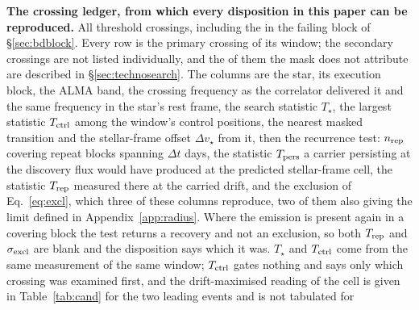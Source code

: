 \begin{table}
\centering
\caption{\textbf{The crossing ledger, from which every disposition in this
paper can be reproduced.} All \EvNCrossRaw{} threshold crossings,
including the \EvNCrossFlag{} in the failing block of \S\ref{sec:bdblock}.
Every row is the primary crossing of its window; the \CkNSecondary{} secondary
crossings are not listed individually, and the \CkNSecUnattrWord{} of them
the mask does not attribute are described in \S\ref{sec:technosearch}. The columns are
the star, its execution block, the ALMA band, the crossing
frequency as the correlator delivered it and the same frequency in the star's
rest frame, the search statistic $T_\star$, the largest statistic
$T_{\rm ctrl}$ among the window's \NCtrl{} control positions, the nearest
masked transition and the stellar-frame offset $\Delta v_\star$ from it, then
the recurrence test: $n_{\rm rep}$ covering repeat blocks spanning $\Delta t$
days, the statistic $T_{\rm pers}$ a carrier persisting at the discovery flux
would have produced at the predicted stellar-frame cell, the statistic
$T_{\rm rep}$ measured there at the carried drift, and the exclusion of
Eq.~\ref{eq:excl}, which three of these columns reproduce, two of them also
giving the limit defined in Appendix~\ref{app:radius}. Where the emission is
present again in a covering block the test returns a recovery and not an
exclusion, so both $T_{\rm rep}$ and $\sigma_{\rm excl}$ are blank and the
disposition says which it was.
$T_\star$ and $T_{\rm ctrl}$ come from the same measurement of the
same window; $T_{\rm ctrl}$ gates nothing and says only which crossing was
examined first, and the drift-maximised reading of the cell is given in
Table~\ref{tab:cand} for the two leading events and is not tabulated for
}
\end{table}
